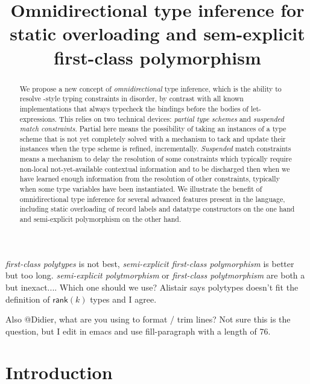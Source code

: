 \documentclass[acmsmall,screen,nonacm]{acmart}
\title{Omnidirectional type inference
   for static overloading and sem-explicit first-class polymorphism}
\begin{document}

\begin{abstract}
We propose a new concept of \emph{omnidirectional} type inference, which is
the ability to resolve \ML-style typing constraints in disorder, by
contrast with all known implementations that always typecheck the
bindings before the bodies of let-expressions.
%
This relies on two technical devices: \emph{partial type schemes}
and \emph{suspended match constraints}. Partial here means  the
possibility of taking an instances of a type scheme that is not yet
completely solved with a mechanism to tack and update their instances when
the type scheme is refined, incrementally.
\emph{Suspended} match constraints means a mechanism to delay the resolution of
some constraints which typically require non-local not-yet-available
contextual information and to be discharged then when we have learned enough
information from the resolution of other constraints, typically when some type
variables have been instantiated.
%
We illustrate the benefit of omnidirectional type inference for several
advanced features present in the \OCaml language, including static
overloading of record labels and datatype constructors on the one hand and
semi-explicit polymorphism on the other hand. 
\end{abstract}

\maketitle

\Xdidier
  {\emph{first-class polytypes} is not best,
   \emph{semi-explicit first-class polymorphism} is better but too long.
   \emph{semi-explicit polytmorphism} or 
   \emph{first-class polytmorphism} are both a but inexact....
   Which one should we use?
   Alistair says polytypes doesn't fit the definition of $\mathsf{rank}(k)$
  types and I agree.} 


\Xalistair
  {Also @Didier, what are you using to format / trim lines?
   Not sure this is the question, but I edit in emacs and use
   fill-paragraph with a length of 76.}

\section{Introduction}
\end{document}
